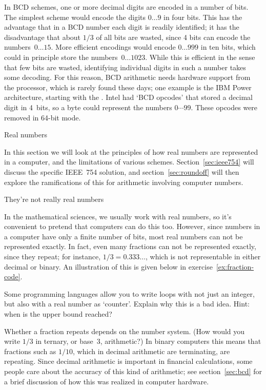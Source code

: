 In BCD schemes, one or more decimal digits are encoded in a number of
bits. The simplest scheme would encode the digits $0\ldots9$ in four
bits. This has the advantage that in a
BCD number each digit is readily identified; it has the disadvantage
that about $1/3$ of all bits are wasted, since 4 bits can
encode the numbers~$0\ldots15$.
%
More efficient encodings would encode $0\ldots999$ in ten bits, which
could in principle store the numbers~$0\ldots1023$. While this is
efficient in the sense that few bits are wasted, identifying
individual digits in such a number takes some decoding. For this
reason, BCD arithmetic needs hardware support from the processor,
which is rarely found these days; one example is the IBM
Power architecture, starting with the .
Intel had `BCD opcodes' that stored a decimal digit in 4~bits,
so a byte could represent the numbers $0\cdots 99$.
These opcodes were removed in 64-bit mode.

 {Real numbers}
\label{sec:real-numbers}

In this section we will look at the principles of how real numbers are
represented in a computer, and the limitations of various schemes.
Section~\ref{sec:ieee754} will discuss the specific IEEE~754
solution, and
section~\ref{sec:roundoff} will then explore the ramifications of this for arithmetic
involving computer numbers.

 {They're not really real numbers}
\label{sec:arith-intro}

In the mathematical sciences, we usually work with real numbers, so
it's convenient to pretend that computers can do this too. However,
since numbers in a computer have only a finite number of bits, most
real numbers can not be represented exactly. In fact, even many
fractions can not be represented exactly, since they repeat; for
instance, $1/3=0.333\ldots$, which is not representable in either
decimal or binary.
An illustration of this is given below
in exercise~\ref{ex:fraction-code}.

\begin{exercise}
  Some programming languages allow you to write loops with not just an
  integer, but also with a real number as `counter'. Explain why this
  is a bad idea. Hint: when is the upper bound reached?
\end{exercise}

Whether a fraction repeats depends on the number system. (How would
you write $1/3$ in ternary, or base~3, arithmetic?) In binary computers
this means that fractions such as $1/10$, which in decimal arithmetic
are terminating, are repeating. Since decimal arithmetic is important
in financial calculations, some
people care about the accuracy of this kind of arithmetic;
see section~\ref{sec:bcd} for a brief discussion
of how this was realized in computer hardware.

